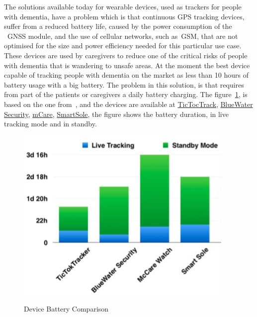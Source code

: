  The solutions available today  for wearable devices, used as trackers for people with dementia, have a problem which is that continuous GPS tracking devices, suffer from a reduced battery life, caused by the power consumption of the ~\gls{GNSS} module,  and the use of cellular networks, such as~\gls{GSM}, that are not optimised for the size and power efficiency needed for this particular use case. These devices are  used by caregivers to reduce  one of the critical risks of people with dementia that is wandering to unsafe areas. At the moment the best device capable of tracking people with dementia  on the market as less than 10 hours of battery usage with a big battery.
The problem in this solution, is that  requires from part of the  patients or caregivers a daily battery charging.
The figure~\ref{fig:Device-battery-Comparison}, is based on the one from~\cite{Hadwen2017}, and the devices are available at \href{https://www.tictoctrack.com.au/}{TicTocTrack}, \href{http://www.bluewatersecurityprofessionals.com/elderlytracking.htm}{BlueWater Security},  \href{https://mcarewatch.com.au/}{mCare}, \href{https://gpssmartsole.com/gpssmartsole/}{SmartSole}, the figure shows the battery duration, in live tracking mode and in standby.\newline\newline\newline\newline\newline
\begin{figure}[htbp]
  \centering
  
    {\includegraphics[height=2.8 in,width=0.55\linewidth]{Chapters/Figures/PWD-batery.JPG}}%
 
  \caption{Device Battery Comparison}
  \label{fig:Device-battery-Comparison}
\end{figure}

